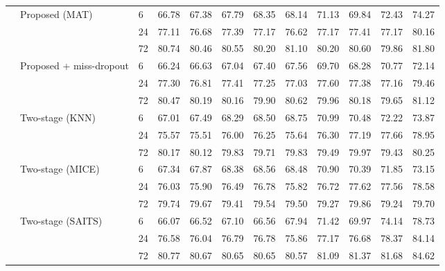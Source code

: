 \begin{table}
\begin{tabular}{lllrrrrrrrrr}
\cline{2-12}
 & \multirow[t]{3}{*}{Proposed (MAT)} & 6 & 66.78 & 67.38 & 67.79 & 68.35 & 68.14 & 71.13 & 69.84 & 72.43 & 74.27 \\
 &  & 24 & 77.11 & 76.68 & 77.39 & 77.17 & 76.62 & 77.17 & 77.41 & 77.17 & 80.16 \\
 &  & 72 & 80.74 & 80.46 & 80.55 & 80.20 & 81.10 & 80.20 & 80.60 & 79.86 & 81.80 \\
\cline{2-12}
 & \multirow[t]{3}{*}{Proposed + miss-dropout} & 6 & 66.24 & 66.63 & 67.04 & 67.40 & 67.56 & 69.70 & 68.28 & 70.77 & 72.14 \\
 &  & 24 & 77.30 & 76.81 & 77.41 & 77.25 & 77.03 & 77.60 & 77.38 & 77.16 & 79.46 \\
 &  & 72 & 80.47 & 80.19 & 80.16 & 79.90 & 80.62 & 79.96 & 80.18 & 79.65 & 81.12 \\
\cline{2-12}
 & \multirow[t]{3}{*}{Two-stage (KNN)} & 6 & 67.01 & 67.49 & 68.29 & 68.50 & 68.75 & 70.99 & 70.48 & 72.22 & 73.87 \\
 &  & 24 & 75.57 & 75.51 & 76.00 & 76.25 & 75.64 & 76.30 & 77.19 & 77.66 & 78.95 \\
 &  & 72 & 80.17 & 80.12 & 79.83 & 79.71 & 79.83 & 79.49 & 79.97 & 79.43 & 80.25 \\
\cline{2-12}
 & \multirow[t]{3}{*}{Two-stage (MICE)} & 6 & 67.34 & 67.87 & 68.38 & 68.56 & 68.48 & 70.90 & 70.39 & 71.85 & 73.15 \\
 &  & 24 & 76.03 & 75.90 & 76.49 & 76.78 & 75.82 & 76.72 & 77.62 & 77.56 & 78.58 \\
 &  & 72 & 79.74 & 79.67 & 79.41 & 79.54 & 79.50 & 79.27 & 79.86 & 79.24 & 79.70 \\
\cline{2-12}
 & \multirow[t]{3}{*}{Two-stage (SAITS)} & 6 & 66.07 & 66.52 & 67.10 & 66.56 & 67.94 & 71.42 & 69.97 & 74.14 & 78.73 \\
 &  & 24 & 76.58 & 76.04 & 76.79 & 76.78 & 75.86 & 77.17 & 76.68 & 78.37 & 84.14 \\
 &  & 72 & 80.77 & 80.67 & 80.65 & 80.65 & 80.57 & 81.09 & 81.37 & 81.68 & 84.62 \\
\cline{1-12} \cline{2-12}
\bottomrule
\end{tabular}
\end{table}
